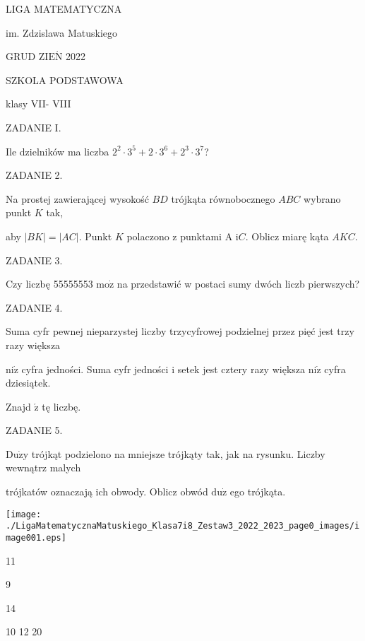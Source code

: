 \documentclass[a4paper,12pt]{article}
\begin{document}
LIGA MATEMATYCZNA

im. Zdzislawa Matuskiego

GRUD Z$\mathrm{I}\mathrm{E}\acute{\mathrm{N}}$ 2022

SZKOLA PODSTAWOWA

klasy VII- VIII

ZADANIE I.

Ile dzielników ma liczba $2^{2}\cdot 3^{5}+2\cdot 3^{6}+2^{3}\cdot 3^{7}$?

ZADANIE 2.

Na prostej zawierającej wysokość $BD$ trójkąta równobocznego $ABC$ wybrano punkt $K$ tak,

aby $|BK|=|AC|$. Punkt $K$ polaczono z punktami A $\mathrm{i}C$. Oblicz miarę kąta $AKC.$

ZADANIE 3.

Czy liczbę 55555553 $\mathrm{m}\mathrm{o}\dot{\mathrm{z}}$ na przedstawić w postaci sumy dwóch liczb pierwszych?

ZADANIE 4.

Suma cyfr pewnej nieparzystej liczby trzycyfrowej podzielnej przez pięć jest trzy razy większa

$\mathrm{n}\mathrm{i}\dot{\mathrm{z}}$ cyfra jedności. Suma cyfr jedności i setek jest cztery razy większa $\mathrm{n}\mathrm{i}\dot{\mathrm{z}}$ cyfra dziesiątek.

Znajd $\acute{\mathrm{z}}$ tę liczbę.

ZADANIE 5.

$\mathrm{D}\mathrm{u}\dot{\mathrm{z}}\mathrm{y}$ trójkąt podzielono na mniejsze trójkąty tak, jak na rysunku. Liczby wewnątrz malych

trójkatów oznaczają ich obwody. Oblicz obwód $\mathrm{d}\mathrm{u}\dot{\mathrm{z}}$ ego trójkąta.
\begin{center}
\texttt{[image: ./LigaMatematycznaMatuskiego\_Klasa7i8\_Zestaw3\_2022\_2023\_page0\_images/image001.eps]}
\end{center}
11

9

14

10  12  20
\end{document}
